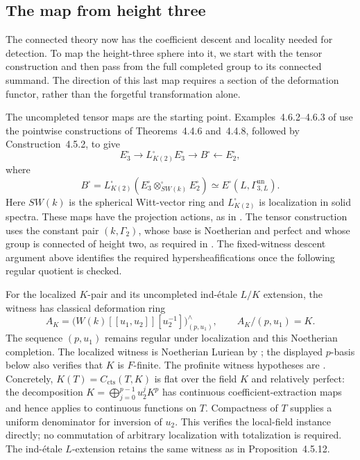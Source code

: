 \documentclass[11pt]{article}
\numberwithin{equation}{section}
\theoremstyle{definition}
\theoremstyle{remark}
\newcommand{\cts}{\mathrm{cts}}
\begin{document}
\subsection{The map from height three}

The connected theory now has the coefficient descent and locality needed
for detection. To map the height-three sphere into it, we start with the
tensor construction and then pass from the full completed group to its
connected summand. The direction of this last map requires a section of
the deformation functor, rather than the forgetful transformation alone.

The uncompleted tensor maps are the starting point. Examples~4.6.2--4.6.3 of
\cite{BMR2026} use the pointwise constructions of Theorems~4.4.6 and~4.4.8,
followed by Construction~4.5.2, to give
\[
 E_3^{\square}\longrightarrow L_{K(2)}^{\square}E_3^{\square}
   \longrightarrow B^{\square}\longleftarrow E_2^{\square},
\]
where
\[
 B^{\square}
 =L_{K(2)}^{\square}
    (E_3^{\square}\otimes_{SW(k)}^{\square}E_2^{\square})
 \simeq E^{\square}(L,\Gamma^{\mathrm{un}}_{3,L}).
\]
Here \(SW(k)\) is the spherical Witt-vector ring and
\(L_{K(2)}^{\square}\) is localization in solid spectra. These maps have
the projection actions, as in \cite[(5.2.2)--(5.2.3)]{BMR2026}.
The tensor construction uses the constant pair \((k,\Gamma_2)\), whose
base is Noetherian and perfect and whose group is connected of height
two, as required in \cite[Construction~4.4.7]{BMR2026}. The fixed-witness
descent argument above identifies the required hypersheafifications once
the following regular quotient is checked.

For the localized $K$-pair and its uncompleted ind-\'{e}tale $L/K$
extension, the witness has classical deformation ring
\[
 A_K=\bigl(W(k)[[u_1,u_2]][u_2^{-1}]\bigr)^{\wedge}_{(p,u_1)},
 \qquad A_K/(p,u_1)=K.
\]
The sequence $(p,u_1)$ remains regular under localization and this
Noetherian completion. The localized witness is Noetherian Luriean
by \cite[Proposition~4.4.4 and Remark~4.2.2]{BMR2026}; the displayed
$p$-basis below also verifies that $K$ is $F$-finite. The profinite witness hypotheses are
\cite[Propositions~4.5.9, 4.5.10, and 4.5.12, Definition~4.5.11,
and Examples~4.6.1--4.6.3]{BMR2026}.
Concretely, $K(T)=C_{\cts}(T,K)$ is flat over the field $K$ and
relatively perfect: the decomposition
$K=\bigoplus_{j=0}^{p-1}u_2^jK^p$ has continuous coefficient-extraction
maps and hence applies to continuous functions on $T$.
Compactness of $T$ supplies a uniform denominator for inversion of
$u_2$.  This verifies the local-field instance directly; no commutation
of arbitrary localization with totalization is required.
The ind-\'{e}tale $L$-extension retains the same witness as in
Proposition~4.5.12.
\end{document}
